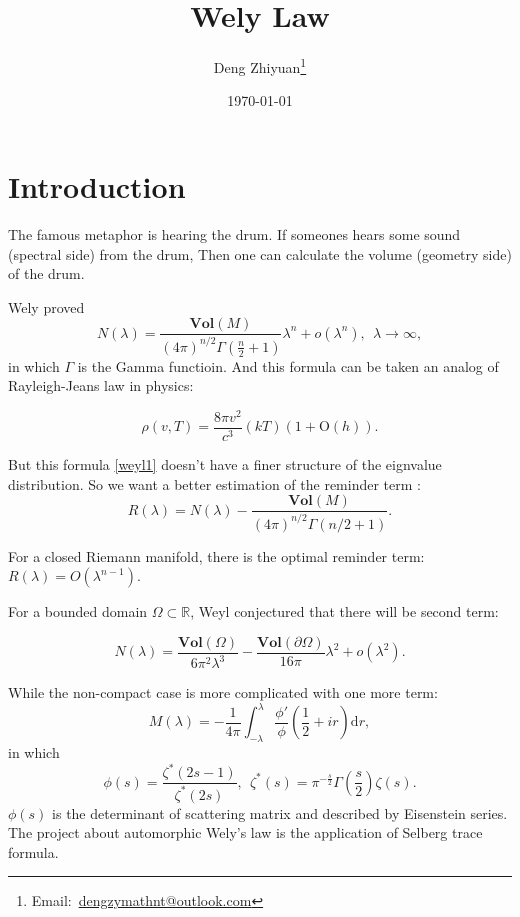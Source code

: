 \documentclass[12pt,a4paper,english]{article}
\title{Wely Law}
\date{\today}
\author{Deng Zhiyuan\footnote{Email:\ \href{mailto:dengzymathnt@outlook.com}{dengzymathnt@outlook.com}}}
\theoremstyle{plain}
\theoremstyle{definition}
\theoremstyle{remark}
\newcommand{\dif}{\text{d}}
\begin{document}
\maketitle
\newpage

\tableofcontents
\newpage

\section{Introduction}
The famous metaphor is hearing the drum. If someones hears some sound (spectral side) from the drum, Then one can calculate the volume (geometry side) of the drum.
    
    
    Wely proved
    \begin{equation}\label{weyl1}
        N(\lambda)=\frac{\textbf{Vol}(M)}{(4\pi)^{n/2}\Gamma(\frac{n}{2}+1)}\lambda^{n}+o(\lambda^{n}), \ \ \lambda\rightarrow\infty,
    \end{equation}
    in which $\Gamma$ is the Gamma functioin. And this formula
    can be taken an analog of  Rayleigh-Jeans law in physics: 

\begin{equation*}
    \rho(v,T)=\frac{8\pi v^{2}}{c^{3}}(kT)(1+ \text{O}(h)).
\end{equation*}

But this formula \ref{weyl1} doesn't have a finer structure of the eignvalue distribution. So we want a better estimation of the reminder term :
\begin{equation}\label{reminder}
   R(\lambda)=N(\lambda)-\frac{\textbf{Vol}(M)}{(4\pi)^{n/2}\Gamma(n/2+1)}.
\end{equation}

For a closed Riemann manifold, there is the optimal reminder term: $R(\lambda)=O(\lambda^{n-1})$.

For a bounded domain $\Omega\subset \mathbb{R}$, Weyl conjectured that there will be second term:

\begin{equation*}
    N(\lambda)=\frac{\textbf{Vol}(\Omega)}{6\pi^{2}\lambda^{3}}-\frac{\textbf{Vol}(\partial\Omega)}{16\pi}\lambda^{2}+o(\lambda^{2}).
\end{equation*}



    
While the non-compact case is more complicated with one more term:
    \begin{equation*}
      M(\lambda)=-\frac{1}{4\pi}\int^{\lambda}_{-\lambda}\frac{\phi'}{\phi}(\frac{1}{2}+ir)\dif r,
    \end{equation*}
    in which 
    \begin{equation*}
      \phi(s)=\frac{\zeta^{*}(2s-1)}{\zeta^{*}(2s)},\ \ \zeta^{*}(s)=\pi^{-\frac{s}{2}}\Gamma(\frac{s}{2})\zeta(s).
    \end{equation*}
    $\phi(s)$ is the determinant of scattering matrix and described by Eisenstein series.
        The project about automorphic Wely's law is the application of Selberg trace formula. 
    
\end{document}

